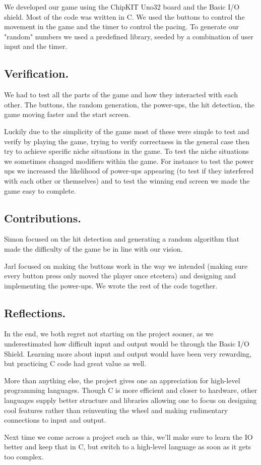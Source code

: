 \documentclass[a4paper,11pt,twoside]{article}
\begin{document}
We developed our game using the ChipKIT Uno32 board and the Basic I/O shield. Most of the code was written in C. We used the buttons to control the movement in the game and the timer to control the pacing. To generate our "random" numbers we used a predefined library, seeded by a combination of user input and the timer.

\subsection*{Verification.}

We had to test all the parts of the game and how they interacted with each other. The buttons, the random generation, the power-ups, the hit detection, the game moving faster and the start screen.\par
Luckily due to the simplicity of the game most of these were simple to test and verify by playing the game, trying to verify correctness in the general case then try to achieve specific niche situations in the game. To test the niche situations we sometimes changed modifiers within the game. For instance to test the power ups we increased the likelihood of power-ups appearing (to test if they interfered with each other or themselves) and to test the winning end screen we made the game easy to complete.

\newpage

\subsection*{Contributions.}

Simon focused on the hit detection and generating a random algorithm that made the difficulty of the game be in line with our vision.\par
Jarl focused on making the buttons work in the way we intended (making sure every button press only moved the player once etcetera) and designing and implementing the power-ups. We wrote the rest of the code together.

\subsection*{Reflections.}

In the end, we both regret not starting on the project sooner, as we underestimated how difficult input and output would be through the Basic I/O Shield. Learning more about input and output would have been very rewarding, but practicing C code had great value as well.\par
More than anything else, the project gives one an appreciation for high-level programming languages. Though C is more efficient and closer to hardware, other languages supply better structure and libraries allowing one to focus on designing cool features rather than reinventing the wheel and making rudimentary connections to input and output.\par
Next time we come across a project such as this, we'll make sure to learn the IO better and keep that in C, but switch to a high-level language as soon as it gets too complex.
\end{document}

